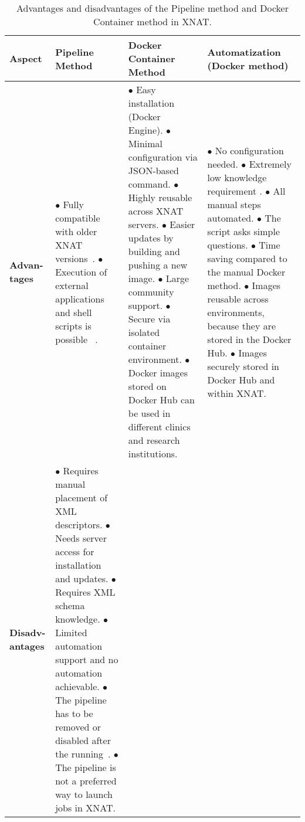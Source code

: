 \begin{table}[htbp]
\centering
\caption{Advantages and disadvantages of the Pipeline method and Docker Container method in XNAT.}
\label{tab:adv-disadv}
\renewcommand{\arraystretch}{4}
\begin{tabular}{|p{1cm}|p{3cm}|p{5cm}|p{4cm}|}
\hline
\textbf{Aspect} & \textbf{Pipeline Method} & \textbf{Docker Container Method} & \textbf{Automatization (Docker method)} \\
\hline
\textbf{Advan-tages} &
\parbox[t]{3cm}{
$\bullet$ Fully compatible with older XNAT versions~\cite{Pipelinecompatible}.\\
$\bullet$ Execution of external applications and shell scripts is possible ~\cite{jansen_extending_2015}.
}
&
\parbox[t]{5cm}{
$\bullet$ Easy installation (Docker Engine). \\
$\bullet$ Minimal configuration via JSON-based command.\\
$\bullet$ Highly reusable across XNAT servers. \\
$\bullet$ Easier updates by building and pushing a new image. \\
$\bullet$ Large community support.\\
$\bullet$ Secure via isolated container environment. \\
$\bullet$ Docker images stored on Docker Hub can be used in different clinics and research institutions.\\
}
&
\parbox[t]{3cm}{
$\bullet$ No configuration needed. \\
$\bullet$ Extremely low knowledge requirement . \\
$\bullet$ All manual steps automated. \\
$\bullet$ The script asks simple questions. \\
$\bullet$ Time saving compared to the manual Docker method. \\
$\bullet$ Images reusable across environments, because they are stored in the Docker Hub. \\
$\bullet$ Images securely stored in Docker Hub and within XNAT.\\
} \\
\hline
\textbf{Disadv-antages} &
\parbox[t]{3cm}{
$\bullet$ Requires manual placement of XML descriptors.\\
$\bullet$ Needs server access for installation and updates.\\
$\bullet$ Requires XML schema knowledge.\\
$\bullet$ Limited automation support and no automation achievable.\\
$\bullet$ The pipeline has to be  removed or disabled after the running~\cite{addingpipeline}.\\
$\bullet$ The pipeline is not a preferred way to launch jobs in XNAT.\\

}
\end{tabular}
\end{table}
